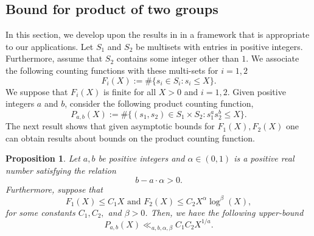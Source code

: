 \documentclass[11pt]{amsart}
\newtheorem{proposition}[theorem]{Proposition}
\numberwithin{equation}{section}
\begin{document}
\subsection{Bound for product of two groups} 
In this section, we develop upon the results in \cite[Section 3]{Wang2020} in a framework that is appropriate to our applications. Let $S_1$ and $S_2$ be multisets with entries in positive integers. Furthermore, assume that $S_2$ contains some integer other than $1$. We associate the following counting functions with these multi-sets for $i=1,2$
\begin{equation}
    F_i(X):= \#\{s_i \in S_i : s_i \leq X\}.
\end{equation}
We suppose that $F_i(X)$ is finite for all $X>0$ and $i=1,2$. Given positive integers $a$ and $b$, consider the following product counting function,
\begin{equation}
    P_{a,b}(X):= \#\{(s_1,s_2) \in S_1\times S_2 : s_1^as_2^b \leq X\}.
\end{equation}
 The next result shows that given asymptotic bounds for $F_1(X), F_2(X)$ one can obtain results about bounds on the product counting function.
\begin{proposition}\label{upper prod}
   Let $a,b$ be positive integers and $\alpha\in (0,1)$ is a positive real number satisfying the relation\begin{equation}b-a\cdot\alpha > 0.\end{equation} Furthermore, suppose that
    \[
    F_1(X) \leq C_1 X \text{ and }F_2(X) \leq C_2 X^{\alpha}\log^{\beta}(X),
    \]
    for some constants $C_1, C_2,$ and $\beta >0$. Then, we have the following upper-bound
   \begin{equation}
       P_{a,b}(X) \ll_{a, b, \alpha, \beta} C_1C_2X^{1/a}.
   \end{equation}
\end{proposition}
\end{document}
